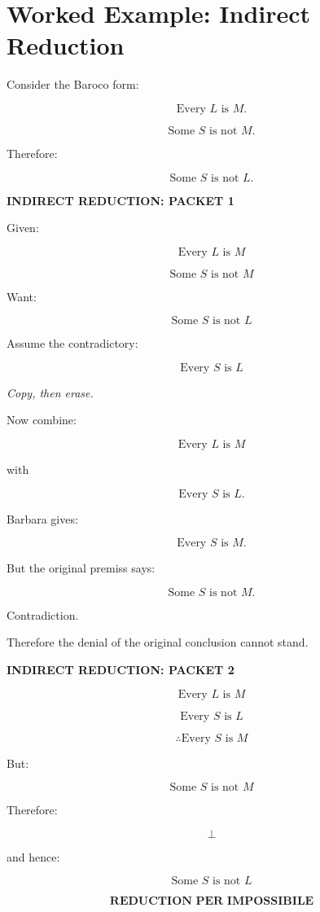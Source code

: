 \documentclass[11pt]{article}
\begin{document}
\section{Worked Example: Indirect Reduction}

Consider the Baroco form:

\[
\text{Every }L\text{ is }M.
\]

\[
\text{Some }S\text{ is not }M.
\]

Therefore:

\[
\text{Some }S\text{ is not }L.
\]

\newpage

\begin{whiteboard}
\textbf{INDIRECT REDUCTION: PACKET 1}

Given:

\[
\text{Every }L\text{ is }M
\]

\[
\text{Some }S\text{ is not }M
\]

Want:

\[
\text{Some }S\text{ is not }L
\]

Assume the contradictory:

\[
\text{Every }S\text{ is }L
\]

\textit{Copy, then erase.}
\end{whiteboard}

Now combine:

\[
\text{Every }L\text{ is }M
\]

with

\[
\text{Every }S\text{ is }L.
\]

Barbara gives:

\[
\text{Every }S\text{ is }M.
\]

But the original premiss says:

\[
\text{Some }S\text{ is not }M.
\]

Contradiction.

Therefore the denial of the original conclusion cannot stand.

\newpage

\begin{whiteboard}
\textbf{INDIRECT REDUCTION: PACKET 2}

\[
\text{Every }L\text{ is }M
\]

\[
\text{Every }S\text{ is }L
\]

\[
\therefore
\text{Every }S\text{ is }M
\]

But:

\[
\text{Some }S\text{ is not }M
\]

Therefore:

\[
\bot
\]

and hence:

\[
\boxed{\text{Some }S\text{ is not }L}
\]

\[
\textbf{REDUCTION PER IMPOSSIBILE}
\]
\end{whiteboard}
\end{document}
